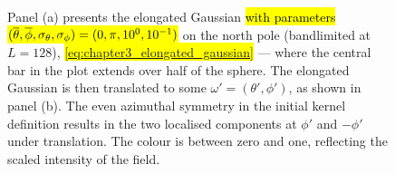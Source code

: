 \begin{figure}[htpb]
	\centering\capstart{}
	\hfill
	\caption[
		An elongated Gaussian on the north pole and then translated
	]{
		Panel (a) presents the elongated Gaussian \hl{with parameters \mbox{\((\overline{\theta},\overline{\phi},\sigma_{\theta},\sigma_{\phi}) = (0,\pi,10^{0},10^{-1})\)}} on the north pole (bandlimited at \(L=128\)), \hl{\cf{} \mbox{\cref{eq:chapter3_elongated_gaussian}}} --- where the central bar in the plot extends over half of the sphere.
		The elongated Gaussian is then translated to some \(\omega'=(\theta',\phi')\), as shown in panel (b).
		The even azimuthal symmetry in the initial kernel definition results in the two localised components at \(\phi'\) and \(-\phi'\) under translation.
		The colour is between zero and one, reflecting the scaled intensity of the field.
	}\label{fig:chapter3_elongated_gaussian}
\end{figure}
